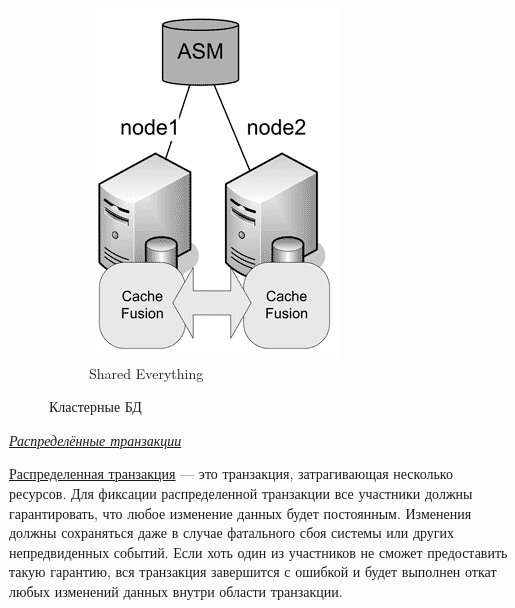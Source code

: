 \begin{figure}[h]
\begin{subfigure}[b]{0.2\textwidth}
		\includegraphics[width=\textwidth]{7/07_04.png}
		\caption{Shared Everything}
		\label{fig:my_label}
	\end{subfigure}
	
	\caption{Кластерные БД}
	\label{fig:my_label4}
\end{figure}


\begin{center}
	\textit{\underline{Распределённые транзакции}}
\end{center}

\href{https://en.wikipedia.org/wiki/Distributed_transaction}{Распределенная транзакция} — это транзакция, затрагивающая несколько ресурсов. Для фиксации распределенной транзакции все участники должны гарантировать, что любое изменение данных будет постоянным. Изменения должны сохраняться даже в случае фатального сбоя системы или других непредвиденных событий. Если хоть один из участников не сможет предоставить такую гарантию, вся транзакция завершится с ошибкой и будет выполнен откат любых изменений данных внутри области транзакции.